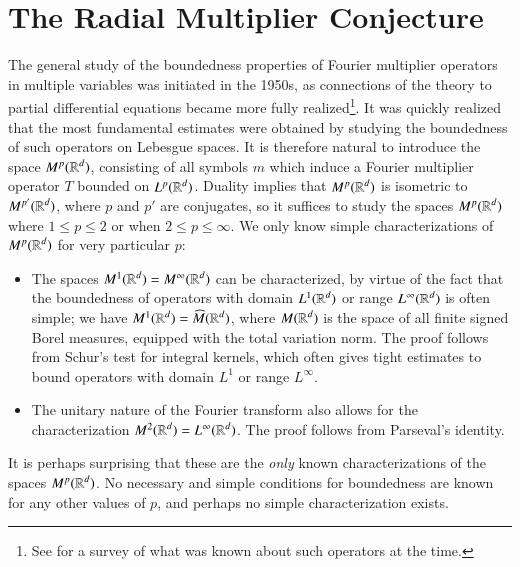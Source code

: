 \section{The Radial Multiplier Conjecture}

The general study of the boundedness properties of Fourier multiplier operators in multiple variables was initiated in the 1950s, as connections of the theory to partial differential equations became more fully realized\footnote{See \cite{Hormander1} for a survey of what was known about such operators at the time.}. It was quickly realized that the most fundamental estimates were obtained by studying the boundedness of such operators on Lebesgue spaces.
%
%
%
It is therefore natural to introduce the space $M^p(\operatorname{\mathbb{R}}^d)$, consisting of all symbols $m$ which induce a Fourier multiplier operator $T$ bounded on $L^p(\operatorname{\mathbb{R}}^d)$. Duality implies that $M^p(\operatorname{\mathbb{R}}^d)$ is isometric to $M^{p'}(\operatorname{\mathbb{R}}^d)$, where $p$ and $p'$ are conjugates, so it suffices to study the spaces $M^p(\operatorname{\mathbb{R}}^d)$ where $1 \leq p \leq 2$ or when $2 \leq p \leq \infty$. We only know simple characterizations of $M^p(\operatorname{\mathbb{R}}^d)$ for very particular $p$:
%
\begin{itemize}
    \item The spaces $M^1(\operatorname{\mathbb{R}}^d) = M^\infty(\operatorname{\mathbb{R}}^d)$ can be characterized, by virtue of the fact that the boundedness of operators with domain $L^1(\operatorname{\mathbb{R}}^d)$ or range $L^\infty(\operatorname{\mathbb{R}}^d)$ is often simple; we have $M^1(\operatorname{\mathbb{R}}^d) = \widehat{M}(\operatorname{\mathbb{R}}^d)$, where  $M(\operatorname{\mathbb{R}}^d)$ is the space of all finite signed Borel measures, equipped with the total variation norm. The proof follows from Schur's test for integral kernels, which often gives tight estimates to bound operators with domain $L^1$ or range $L^\infty$.

    \item The unitary nature of the Fourier transform also allows for the characterization $M^2(\operatorname{\mathbb{R}}^d) = L^\infty(\operatorname{\mathbb{R}}^d)$. The proof follows from Parseval's identity.
\end{itemize}
%
It is perhaps surprising that these are the \emph{only} known characterizations of the spaces $M^p(\operatorname{\mathbb{R}}^d)$. No necessary and simple conditions for boundedness are known for any other values of $p$, and perhaps no simple characterization exists.

